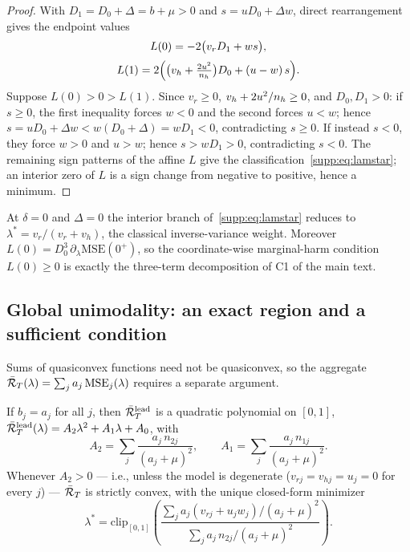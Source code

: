 \begin{proof}
With $D_1 = D_0 + \Delta = b + \mu > 0$ and $s = uD_0 + \Delta w$, direct rearrangement gives the endpoint values
\begin{equation}
\begin{gathered}
L(0) = -2\big(v_r D_1 + w s\big),
\\[2pt]
L(1) = 2\Big(\big(v_h + \tfrac{2u^2}{n_h}\big) D_0 + (u - w)\, s\Big) .
\end{gathered}
\label{supp:eq:endpoints}
\end{equation}
Suppose $L(0) > 0 > L(1)$.
Since $v_r \ge 0$, $v_h + 2u^2/n_h \ge 0$, and $D_0, D_1 > 0$: if $s \ge 0$, the first inequality forces $w < 0$ and the second forces $u < w$; hence $s = uD_0 + \Delta w < w(D_0 + \Delta) = w D_1 < 0$, contradicting $s \ge 0$.
If instead $s < 0$, they force $w > 0$ and $u > w$; hence $s > w D_1 > 0$, contradicting $s < 0$.
The remaining sign patterns of the affine $L$ give the classification~\eqref{supp:eq:lamstar}; an interior zero of $L$ is a sign change from negative to positive, hence a minimum.
\end{proof}

\begin{remark}
At $\delta = 0$ and $\Delta = 0$ the interior branch of~\eqref{supp:eq:lamstar} reduces to $\lambda^* = v_r/(v_r + v_h)$, the classical inverse-variance weight.
Moreover $L(0) = D_0^3\, \partial_\lambda \mathrm{MSE}(0^+)$, so the coordinate-wise marginal-harm condition $L(0) \ge 0$ is exactly the three-term decomposition of C1 of the main text.
\end{remark}

\subsection{Global unimodality: an exact region and a sufficient condition}

Sums of quasiconvex functions need not be quasiconvex, so the aggregate $\bar{\mathcal{R}}_T(\lambda) = \sum_j a_j\, \mathrm{MSE}_j(\lambda)$ requires a separate argument.

\begin{theorem}\label{supp:thm:quad}
If $b_j = a_j$ for all $j$, then $\bar{\mathcal{R}}_T^{\mathrm{lead}}$ is a quadratic polynomial on $[0,1]$, $\bar{\mathcal{R}}_T^{\mathrm{lead}}(\lambda) = A_2 \lambda^2 + A_1 \lambda + A_0$, with
\begin{equation}
A_2 = \sum_j \frac{a_j\, n_{2j}}{(a_j+\mu)^2},
\qquad
A_1 = \sum_j \frac{a_j\, n_{1j}}{(a_j+\mu)^2}.
\end{equation}
Whenever $A_2 > 0$ --- i.e., unless the model is degenerate ($v_{rj} = v_{hj} = u_j = 0$ for every $j$) --- $\bar{\mathcal{R}}_T$ is strictly convex, with the unique closed-form minimizer
\begin{equation}
\lambda^* = \mathrm{clip}_{[0,1]}\!\left( \frac{\sum_j a_j (v_{rj} + u_j w_j)/(a_j+\mu)^2}{\sum_j a_j\, n_{2j}/(a_j+\mu)^2} \right) .
\label{supp:eq:lamstarquad}
\end{equation}
\end{theorem}

